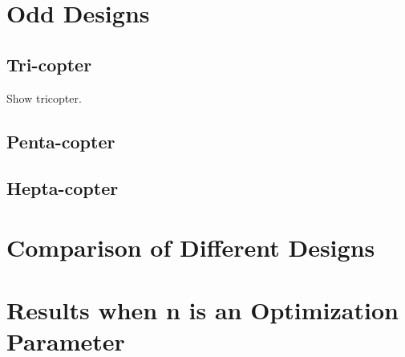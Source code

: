 \begin{table}[!h]
\begin{center}
 \caption{Comparison between two designs' hover capabilities.}\vspace{1ex}
 \label{tab:tab_Hexa_compare_hover}
\end{center}
\end{table}

\section{Odd Designs}
\label{sec:odd_designs}

\subsection{Tri-copter}
\label{sec:tri_copter}
Show tricopter.

\subsection{Penta-copter}
\label{sec:penta_copter}

\subsection{Hepta-copter}
\label{sec:hepta_copter}

\section{Comparison of Different Designs}
\label{sec:comparison}
\section{Results when n is an Optimization Parameter}
\label{sec:result_n}
